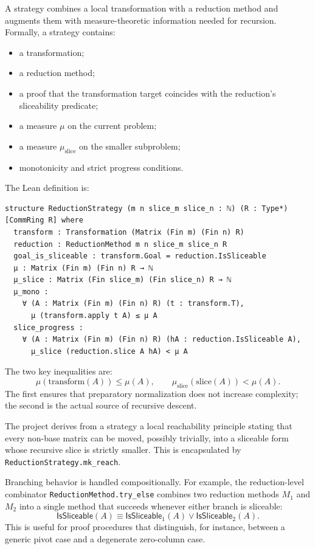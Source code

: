 \documentclass[pdflatex,sn-mathphys-num]{sn-jnl}%
\theoremstyle{thmstyleone}%
\theoremstyle{thmstyletwo}%
\theoremstyle{thmstylethree}%
\begin{document}
A strategy combines a local transformation with a reduction method and augments them with measure-theoretic information needed for recursion.  Formally, a strategy contains:

\begin{itemize}
\item a transformation;
\item a reduction method;
\item a proof that the transformation target coincides with the reduction's sliceability predicate;
\item a measure \(\mu\) on the current problem;
\item a measure \(\mu_{\mathrm{slice}}\) on the smaller subproblem;
\item monotonicity and strict progress conditions.
\end{itemize}

The Lean definition is:

\begin{lstlisting}
structure ReductionStrategy (m n slice_m slice_n : ℕ) (R : Type*) [CommRing R] where
  transform : Transformation (Matrix (Fin m) (Fin n) R)
  reduction : ReductionMethod m n slice_m slice_n R
  goal_is_sliceable : transform.Goal = reduction.IsSliceable
  μ : Matrix (Fin m) (Fin n) R → ℕ
  μ_slice : Matrix (Fin slice_m) (Fin slice_n) R → ℕ
  μ_mono :
    ∀ (A : Matrix (Fin m) (Fin n) R) (t : transform.T),
      μ (transform.apply t A) ≤ μ A
  slice_progress :
    ∀ (A : Matrix (Fin m) (Fin n) R) (hA : reduction.IsSliceable A),
      μ_slice (reduction.slice A hA) < μ A
\end{lstlisting}

The two key inequalities are:
\[
\mu(\text{transform}(A)) \le \mu(A),
\qquad
\mu_{\mathrm{slice}}(\text{slice}(A)) < \mu(A).
\]
The first ensures that preparatory normalization does not increase complexity; the second is the actual source of recursive descent.

The project derives from a strategy a local reachability principle stating that every non-base matrix can be moved, possibly trivially, into a sliceable form whose recursive slice is strictly smaller.  This is encapsulated by \texttt{ReductionStrategy.mk\_reach}.

Branching behavior is handled compositionally.  For example, the reduction-level combinator
\texttt{ReductionMethod.try\_else} combines two reduction methods \(M_1\) and \(M_2\) into a single method that succeeds whenever either branch is sliceable:
\[
\mathsf{IsSliceable}(A) \equiv \mathsf{IsSliceable}_1(A) \lor \mathsf{IsSliceable}_2(A).
\]
This is useful for proof procedures that distinguish, for instance, between a generic pivot case and a degenerate zero-column case.
\end{document}
